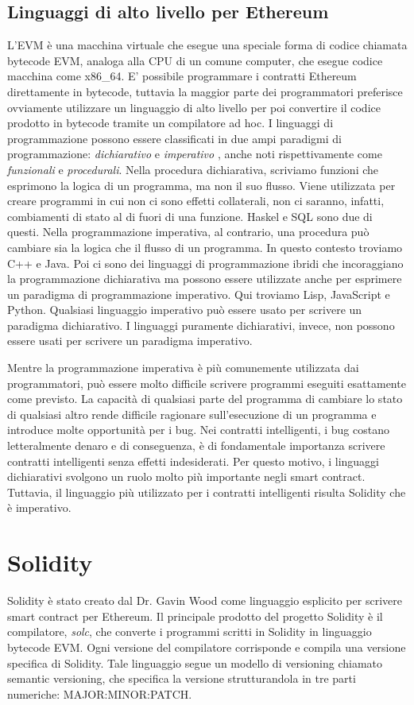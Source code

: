\subsection*{Linguaggi di alto livello per Ethereum}
L'EVM è una macchina virtuale che esegue una speciale forma di codice chiamata bytecode EVM, analoga alla CPU di un comune computer, che esegue codice macchina come x86\_64. E' possibile programmare i contratti Ethereum direttamente in bytecode, tuttavia la maggior parte dei programmatori preferisce ovviamente utilizzare un linguaggio di alto livello per poi convertire il codice prodotto in bytecode tramite un compilatore ad hoc. I linguaggi di programmazione possono essere classificati in due ampi paradigmi di programmazione: \textit{dichiarativo} e \textit{imperativo} , anche noti rispettivamente come \textit{funzionali} e \textit{procedurali}. Nella procedura dichiarativa, scriviamo funzioni che esprimono la logica di un programma, ma non il suo flusso. Viene utilizzata per creare programmi in cui non ci sono effetti collaterali, non ci saranno, infatti, combiamenti di stato al di fuori di una funzione. Haskel e SQL sono due di questi. Nella programmazione imperativa, al contrario, una procedura può cambiare sia la logica che il flusso di un programma. In questo contesto troviamo C++ e Java. Poi ci sono dei linguaggi di programmazione ibridi che incoraggiano la programmazione dichiarativa ma possono essere utilizzate anche per esprimere un paradigma di programmazione imperativo. Qui troviamo Lisp, JavaScript e Python. Qualsiasi linguaggio imperativo può essere usato per scrivere un paradigma dichiarativo. I linguaggi puramente dichiarativi, invece, non possono essere usati per scrivere un paradigma imperativo.

Mentre la programmazione imperativa è più comunemente utilizzata dai programmatori, può essere molto difficile scrivere programmi eseguiti esattamente come previsto. La capacità di qualsiasi parte del programma di cambiare lo stato di qualsiasi altro rende difficile ragionare sull'esecuzione di un programma e introduce molte opportunità per i bug. Nei contratti intelligenti, i bug costano letteralmente denaro e di conseguenza, è di fondamentale importanza scrivere contratti intelligenti senza effetti indesiderati. Per questo motivo, i linguaggi dichiarativi svolgono un ruolo molto più importante negli smart contract. Tuttavia, il linguaggio più utilizzato per i contratti intelligenti risulta Solidity che è imperativo.

\section{Solidity}
Solidity è stato creato dal Dr. Gavin Wood come linguaggio esplicito per scrivere smart contract per Ethereum. Il principale prodotto del progetto Solidity è il compilatore, \textit{solc}, che converte i programmi scritti in Solidity in linguaggio bytecode EVM. Ogni versione del compilatore corrisponde e compila una versione specifica di Solidity. Tale linguaggio segue un modello di versioning chiamato semantic versioning, che specifica la versione strutturandola in tre parti numeriche: MAJOR:MINOR:PATCH.

